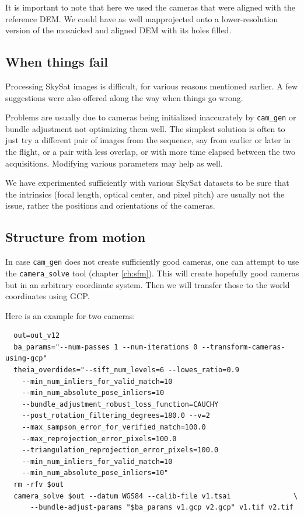 It is important to note that here we used the cameras that were aligned
with the reference DEM. We could have as well mapprojected onto a
lower-resolution version of the mosaicked and aligned DEM with its holes
filled.

\subsection{When things fail}

Processing SkySat images is difficult, for various reasons mentioned
earlier. A few suggestions were also offered along the way when things
go wrong.

Problems are usually due to cameras being initialized inaccurately
by \texttt{cam\_gen} or bundle adjustment not optimizing them well.
The simplest solution is often to just try a different pair of images from the sequence, 
say from earlier or later in the flight, or a pair with less overlap,
or with more time elapsed between the two acquisitions. Modifying various
parameters may help as well.

We have experimented sufficiently with various SkySat datasets
to be sure that the intrinsics (focal length, optical center, and pixel pitch)
are usually not the issue, rather the positions and orientations of the cameras.

\subsection{Structure from motion}

In case \texttt{cam\_gen} does not create sufficiently good cameras, 
one can attempt to use the \texttt{camera\_solve} tool (chapter \ref{ch:sfm}).
This will create hopefully good cameras but in an arbitrary coordinate system.
Then we will transfer those to the world coordinates using GCP.

Here is an example for two cameras:

\begin{verbatim}
  out=out_v12 
  ba_params="--num-passes 1 --num-iterations 0 --transform-cameras-using-gcp"
  theia_overdides="--sift_num_levels=6 --lowes_ratio=0.9 
    --min_num_inliers_for_valid_match=10 
    --min_num_absolute_pose_inliers=10 
    --bundle_adjustment_robust_loss_function=CAUCHY 
    --post_rotation_filtering_degrees=180.0 --v=2  
    --max_sampson_error_for_verified_match=100.0 
    --max_reprojection_error_pixels=100.0 
    --triangulation_reprojection_error_pixels=100.0 
    --min_num_inliers_for_valid_match=10 
    --min_num_absolute_pose_inliers=10"                  
  rm -rfv $out
  camera_solve $out --datum WGS84 --calib-file v1.tsai               \
      --bundle-adjust-params "$ba_params v1.gcp v2.gcp" v1.tif v2.tif 
\end{verbatim} %

